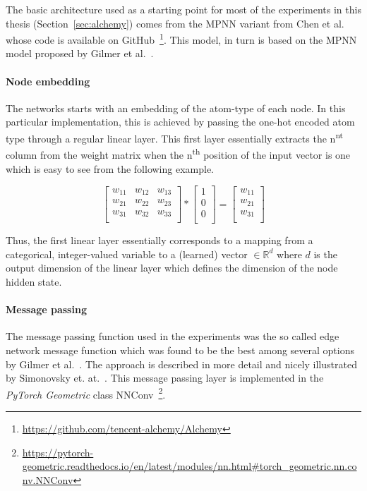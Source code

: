 The basic architecture used as a starting point for most of the experiments in this thesis (Section~\ref{sec:alchemy}) comes from the MPNN variant from Chen et al.~\cite{Chen2019} whose code is available on GitHub~\footnote{\url{https://github.com/tencent-alchemy/Alchemy}}. This model, in turn is based on the MPNN model proposed by Gilmer et al.~\cite{Gilmer2017}.


\paragraph{Node embedding}The networks starts with an embedding of the atom-type of each node. In this particular implementation, this is achieved by passing the one-hot encoded atom type through a regular linear layer. This first layer essentially extracts the n\textsuperscript{nt} column from the weight matrix when the n\textsuperscript{th} position of the input vector is one which is easy to see from the following example.

\begin{equation}
\begin{bmatrix} 
w_{11} & w_{12} & w_{13} \\
w_{21} & w_{22} & w_{23} \\
w_{31} & w_{32} & w_{33} \\
\end{bmatrix}
*
\begin{bmatrix} 
1 \\
0 \\
0 \\
\end{bmatrix}
=
\begin{bmatrix} 
w_{11} \\
w_{21} \\
w_{31} \\
\end{bmatrix}
\end{equation}

Thus, the first linear layer essentially corresponds to a mapping from a categorical, integer-valued variable to a (learned) vector $\in \mathbb{R}^d$ where $d$ is the output dimension of the linear layer which defines the dimension of the node hidden state.

\paragraph{Message passing}

The message passing function used in the experiments was the so called edge network message function which was found to be the best among several options by Gilmer et al.~\cite{Gilmer2017}. The approach is described in more detail and nicely illustrated by Simonovsky et. at.~\cite{Simonovsky2017}. This message passing layer is implemented in the \textit{PyTorch Geometric} class NNConv~\footnote{\url{https://pytorch-geometric.readthedocs.io/en/latest/modules/nn.html\#torch_geometric.nn.conv.NNConv}}\label{fn:pytorch-geometric-nn-docs}.


